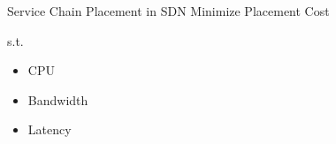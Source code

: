 \begin{frame}{Service Chain Placement in SDN}
    Minimize Placement Cost

    s.t.
    \begin{itemize}
        \item CPU
        \item Bandwidth
        \item Latency
    \end{itemize}
\end{frame}